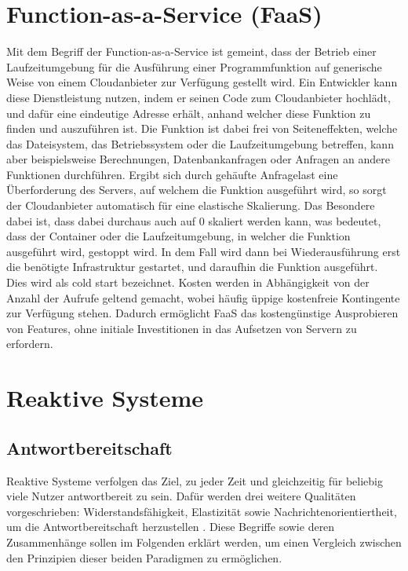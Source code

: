 \section{Function-as-a-Service (FaaS)}
Mit dem Begriff der Function-as-a-Service ist gemeint, dass der Betrieb einer Laufzeitumgebung für die Ausführung einer Programmfunktion auf generische Weise von einem Cloudanbieter zur Verfügung gestellt wird. Ein Entwickler kann diese Dienstleistung nutzen, indem er seinen Code zum Cloudanbieter hochlädt, und dafür eine eindeutige Adresse erhält, anhand welcher diese Funktion zu finden und auszuführen ist. Die Funktion ist dabei frei von Seiteneffekten, welche das Dateisystem, das Betriebssystem oder die Laufzeitumgebung betreffen, kann aber beispielsweise Berechnungen, Datenbankanfragen oder Anfragen an andere Funktionen durchführen. Ergibt sich durch gehäufte Anfragelast eine Überforderung des Servers, auf welchem die Funktion ausgeführt wird, so sorgt der Cloudanbieter automatisch für eine elastische Skalierung. Das Besondere dabei ist, dass dabei durchaus auch auf 0 skaliert werden kann, was bedeutet, dass der Container oder die Laufzeitumgebung, in welcher die Funktion ausgeführt wird, gestoppt wird. In dem Fall wird dann bei Wiederausführung erst die benötigte Infrastruktur gestartet, und daraufhin die Funktion ausgeführt. Dies wird als cold start bezeichnet. Kosten werden in Abhängigkeit von der Anzahl der Aufrufe geltend gemacht, wobei häufig üppige kostenfreie Kontingente zur Verfügung stehen. Dadurch ermöglicht FaaS das kostengünstige Ausprobieren von Features, ohne initiale Investitionen in das Aufsetzen von Servern zu erfordern.

\section{Reaktive Systeme}
\label{sec:res}
\subsection{Antwortbereitschaft}
Reaktive Systeme verfolgen das Ziel, zu jeder Zeit und gleichzeitig für beliebig viele Nutzer antwortbereit zu sein. Dafür werden drei weitere Qualitäten vorgeschrieben: Widerstandsfähigkeit, Elastizität sowie Nachrichtenorientiertheit, um die Antwortbereitschaft herzustellen \cite[vgl.][]{ReactiveManifesto}. Diese Begriffe sowie deren Zusammenhänge sollen im Folgenden erklärt werden, um einen Vergleich zwischen den Prinzipien dieser beiden Paradigmen zu ermöglichen. 

